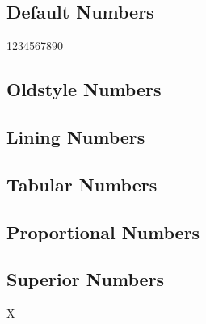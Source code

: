 \documentclass{article}
\begin{document}
\subsection*{Default Numbers}

1234567890

\subsection*{Oldstyle Numbers}


\subsection*{Lining Numbers}


\subsection*{Tabular Numbers}


\subsection*{Proportional Numbers}


\subsection*{Superior Numbers}

X
\end{document}
